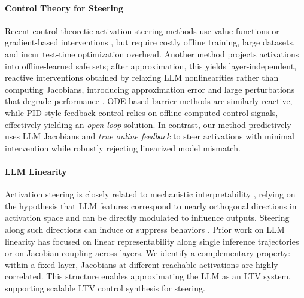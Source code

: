 \documentclass{article}
\theoremstyle{plain}
\theoremstyle{definition}
\theoremstyle{remark}
\begin{document}
\vspace{-8pt}
\paragraph{Control Theory for Steering} Recent control-theoretic activation steering methods use value functions or gradient-based interventions \cite{Kong_Wang_Mu_Du_Zhuang_Zhou_Song_Zhang_Wang_Zhang_2024, Karnik_Bansal_2025}, but require costly offline training, large datasets, and incur test-time optimization overhead. Another method \cite{Cheng_Alonso_2025} projects activations into offline-learned safe sets; after approximation, this yields layer-independent, reactive interventions obtained by relaxing LLM nonlinearities rather than computing Jacobians, introducing approximation error and large perturbations that degrade performance \cite{Kong_Wang_Mu_Du_Zhuang_Zhou_Song_Zhang_Wang_Zhang_2024, Hedstrom_Amoukou_Bewley, tan2024analysing, scalena2024multi}. ODE-based barrier methods \cite{ode_activation_steering, miyaoka2024cbf} are similarly reactive, while PID-style feedback control \cite{Nguyen_Vu_Pham_Zhang_Nguyen_2025} relies on offline-computed control signals, effectively yielding an \textit{open-loop} solution. In contrast, our method predictively uses LLM Jacobians and \textit{true online feedback} to steer activations with minimal intervention while robustly rejecting linearized model mismatch.

\vspace{-8pt}
\paragraph{LLM Linearity} Activation steering is closely related to mechanistic interpretability \cite{bereska2024mechanistic}, relying on the hypothesis that LLM features correspond to nearly orthogonal directions in activation space \cite{Elhage_Hume_Olsson_2022, park2023linear, marks2024the} and can be directly modulated to influence outputs. Steering along such directions can induce or suppress behaviors \cite{Vu_Nguyen_2025, Turner_Thiergart_Leech_Udell_Vazquez_Mini_MacDiarmid_2024}. Prior work on LLM linearity \cite{golden2025equivalent, aubry2025transformer} has focused on linear representability along single inference trajectories or on Jacobian coupling across layers. We identify a complementary property: within a fixed layer, Jacobians at different reachable activations are highly correlated. This structure enables approximating the LLM as an LTV system, supporting scalable LTV control synthesis for steering.
\end{document}
